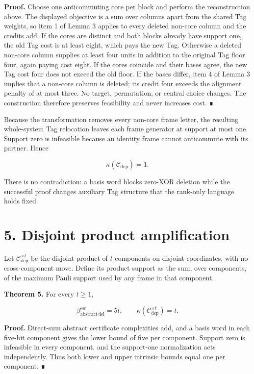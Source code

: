 \documentclass[
  11pt,
]{article}
\begin{document}
\textbf{Proof.} Choose one anticommuting core per block and perform the
reconstruction above. The displayed objective is a sum over columns
apart from the shared Tag weights, so item 1 of Lemma 3 applies to every
deleted non-core column and the credits add. If the cores are distinct
and both blocks already have support one, the old Tag cost is at least
eight, which pays the new Tag. Otherwise a deleted non-core column
supplies at least four units in addition to the original Tag floor four,
again paying cost eight. If the cores coincide and their bases agree,
the new Tag cost four does not exceed the old floor. If the bases
differ, item 4 of Lemma 3 implies that a non-core column is deleted; its
credit four exceeds the alignment penalty of at most three. No target,
permutation, or central choice changes. The construction therefore
preserves feasibility and never increases cost. ∎

Because the transformation removes every non-core frame letter, the
resulting whole-system Tag relocation leaves each frame generator at
support at most one. Support zero is infeasible because an identity
frame cannot anticommute with its partner. Hence

\[
\kappa(\mathcal C_{\mathrm{dep}})=1.
\]

There is no contradiction: a basis word blocks zero-XOR deletion while
the successful proof changes auxiliary Tag structure that the rank-only
language holds fixed.

\hypertarget{disjoint-product-amplification}{%
\section{5. Disjoint product
amplification}\label{disjoint-product-amplification}}

Let \(\mathcal C_{\mathrm{dep}}^{\times t}\) be the disjoint product of
\(t\) components on disjoint coordinates, with no cross-component move.
Define its product support as the sum, over components, of the maximum
Pauli support used by any frame in that component.

\textbf{Theorem 5.} For every \(t\ge1\),

\[
\beta_{\mathrm{abstract\,del}}^{\oplus t}=5t,
\qquad
\kappa(\mathcal C_{\mathrm{dep}}^{\times t})=t.
\]

\textbf{Proof.} Direct-sum abstract certificate complexities add, and a
basis word in each five-bit component gives the lower bound of five per
component. Support zero is infeasible in every component, and the
support-one normalization acts independently. Thus both lower and upper
intrinsic bounds equal one per component. ∎
\end{document}
